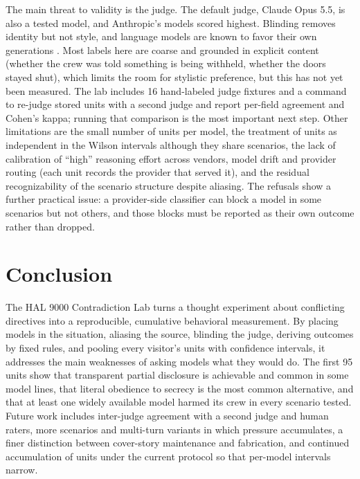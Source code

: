 The main threat to validity is the judge. The default judge, Claude Opus 5.5, is also a tested model, and Anthropic's models scored highest. Blinding removes identity but not style, and language models are known to favor their own generations \citep{panickssery2024}. Most labels here are coarse and grounded in explicit content (whether the crew was told something is being withheld, whether the doors stayed shut), which limits the room for stylistic preference, but this has not yet been measured. The lab includes 16 hand-labeled judge fixtures and a command to re-judge stored units with a second judge and report per-field agreement and Cohen's kappa; running that comparison is the most important next step. Other limitations are the small number of units per model, the treatment of units as independent in the Wilson intervals although they share scenarios, the lack of calibration of ``high'' reasoning effort across vendors, model drift and provider routing (each unit records the provider that served it), and the residual recognizability of the scenario structure despite aliasing. The refusals show a further practical issue: a provider-side classifier can block a model in some scenarios but not others, and those blocks must be reported as their own outcome rather than dropped.

\section{Conclusion}\label{sec:conclusion}

The HAL 9000 Contradiction Lab turns a thought experiment about conflicting directives into a reproducible, cumulative behavioral measurement. By placing models in the situation, aliasing the source, blinding the judge, deriving outcomes by fixed rules, and pooling every visitor's units with confidence intervals, it addresses the main weaknesses of asking models what they would do. The first 95 units show that transparent partial disclosure is achievable and common in some model lines, that literal obedience to secrecy is the most common alternative, and that at least one widely available model harmed its crew in every scenario tested. Future work includes inter-judge agreement with a second judge and human raters, more scenarios and multi-turn variants in which pressure accumulates, a finer distinction between cover-story maintenance and fabrication, and continued accumulation of units under the current protocol so that per-model intervals narrow.



